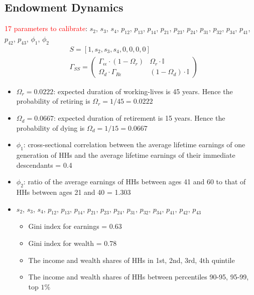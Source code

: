 \documentclass{article}
\begin{document}
\begin{spacing}{1.5}
\subsection*{Endowment Dynamics}
\textcolor{red}{17 parameters to calibrate}: $s_2$, $s_3$, $s_4$, $p_{12}$, $p_{13}$, $p_{14}$, $p_{21}$, $p_{23}$, $p_{24}$, $p_{31}$, $p_{32}$, $p_{34}$, $p_{41}$, $p_{42}$, $p_{43}$, $\phi_1$, $\phi_2$
\begin{align*}
&S=[1, s_2, s_3, s_4, 0, 0, 0, 0]\\
&\Gamma_{SS}=
\begin{pmatrix}
\Gamma_{\epsilon\epsilon}\cdot(1-\Omega_r) & \Omega_r\cdot\mathbb{I}\\
\Omega_d\cdot\Gamma_{R\epsilon} & (1-\Omega_d)\cdot\mathbb{I} 
\end{pmatrix}
\end{align*}
\begin{itemize}
\item $\Omega_r=0.0222$: expected duration of working-lives is 45 years. Hence the probability of retiring is $\Omega_r=1/45=0.0222$
\item $\Omega_d=0.0667$: expected duration of retirement is 15 years. Hence the probability of dying is $\Omega_d=1/15=0.0667$
\item $\phi_1$: cross-sectional correlation between the average lifetime earnings of one generation of HHs and the average lifetime earnings of their immediate descendants = 0.4
\item $\phi_2$: ratio of the average earnings of HHs between ages 41 and 60 to that of HHs between ages 21 and 40 = 1.303
\item $s_2$, $s_3$, $s_4$, $p_{12}$, $p_{13}$, $p_{14}$, $p_{21}$, $p_{23}$, $p_{24}$, $p_{31}$, $p_{32}$, $p_{34}$, $p_{41}$, $p_{42}$, $p_{43}$
\begin{itemize}
\item Gini index for earnings = 0.63
\item Gini index for wealth = 0.78
\item The income and wealth shares of HHs in 1st, 2nd, 3rd, 4th quintile
\item The income and wealth shares of HHs between percentiles 90-95, 95-99, top $1\%$
\end{itemize}
\end{itemize}
\end{spacing}
\end{document}
